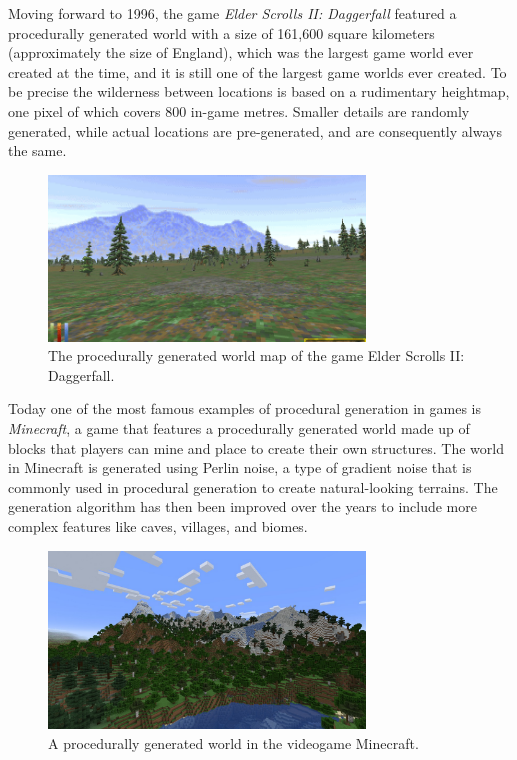 \documentclass{report}
\begin{document}
Moving forward to 1996, the game \textit{Elder Scrolls II: Daggerfall} featured a procedurally
generated world with a size of 161,600 square kilometers (approximately the size of England), which
was the largest game world ever created at the time, and it is still one of the largest game worlds
ever created. To be precise the wilderness between locations is based on a rudimentary heightmap,
one pixel of which covers 800 in-game metres. Smaller details are randomly generated, while actual
locations are pre-generated, and are consequently always the same.

\begin{figure}[h!]
	\centering
	\includegraphics[width=0.75\textwidth]{img/daggerfall.png}
	\caption{The procedurally generated world map of the game Elder Scrolls II: Daggerfall.}
	\label{fig:daggerfall}
\end{figure}

Today one of the most famous examples of procedural generation in games is \textit{Minecraft}, a
game that features a procedurally generated world made up of blocks that players can mine and place
to create their own structures. The world in Minecraft is generated using Perlin noise, a type of
gradient noise that is commonly used in procedural generation to create natural-looking terrains.
The generation algorithm has then been improved over the years to include more complex features
like caves, villages, and biomes.

\begin{figure}[h!]
	\centering
	\includegraphics[width=0.75\textwidth]{img/minecraft.jpg}
	\caption{A procedurally generated world in the videogame Minecraft.}
	\label{fig:minecraft}
\end{figure}
\end{document}
